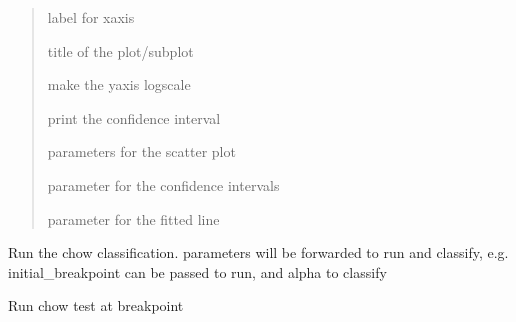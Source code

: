 \documentclass[letterpaper,10pt,english]{sphinxmanual}
\begin{document}
\begin{fulllineitems}
\begin{fulllineitems}
\begin{quote}
\begin{description}
\sphinxAtStartPar
label for x\sphinxhyphen{}axis

\sphinxAtStartPar
title of the plot/subplot

\sphinxAtStartPar
make the y\sphinxhyphen{}axis log\sphinxhyphen{}scale

\sphinxAtStartPar
print the confidence interval

\sphinxAtStartPar
parameters for the scatter plot

\sphinxAtStartPar
parameter for the confidence intervals

\sphinxAtStartPar
parameter for the fitted line

\end{description}\end{quote}

\end{fulllineitems}


\begin{fulllineitems}
\label{\detokenize{source/chowclassifier:chowclassifier.chow.Chow.run}}
\pysigstartsignatures
{}
\pysigstopsignatures
\sphinxAtStartPar
Run the chow classification. parameters will be forwarded to run and classify,
e.g. initial\_breakpoint can be passed to run, and alpha to classify

\end{fulllineitems}


\begin{fulllineitems}
\label{\detokenize{source/chowclassifier:chowclassifier.chow.Chow.run_chow}}
\pysigstartsignatures
{}
\pysigstopsignatures
\sphinxAtStartPar
Run chow test at breakpoint

\end{fulllineitems}



\end{fulllineitems}
\end{document}

